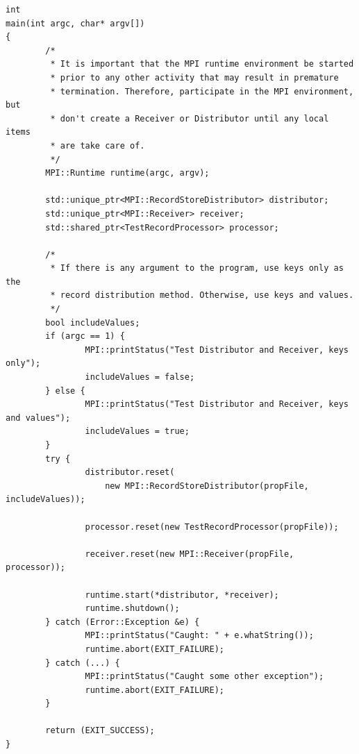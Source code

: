 \begin{lstlisting}[caption={MPI Framework Application Main}, label=lst:mpiappmain]
int
main(int argc, char* argv[])
{
        /*
         * It is important that the MPI runtime environment be started
         * prior to any other activity that may result in premature
         * termination. Therefore, participate in the MPI environment, but
         * don't create a Receiver or Distributor until any local items
         * are take care of.
         */
        MPI::Runtime runtime(argc, argv);

        std::unique_ptr<MPI::RecordStoreDistributor> distributor;
        std::unique_ptr<MPI::Receiver> receiver;
        std::shared_ptr<TestRecordProcessor> processor;

        /*
         * If there is any argument to the program, use keys only as the
         * record distribution method. Otherwise, use keys and values.
         */
        bool includeValues;
        if (argc == 1) {
                MPI::printStatus("Test Distributor and Receiver, keys only");
                includeValues = false;
        } else {
                MPI::printStatus("Test Distributor and Receiver, keys and values");
                includeValues = true;
        }
        try {
                distributor.reset(
                    new MPI::RecordStoreDistributor(propFile, includeValues));

                processor.reset(new TestRecordProcessor(propFile));

                receiver.reset(new MPI::Receiver(propFile, processor));

                runtime.start(*distributor, *receiver);
                runtime.shutdown();
        } catch (Error::Exception &e) {
                MPI::printStatus("Caught: " + e.whatString());
                runtime.abort(EXIT_FAILURE);
        } catch (...) {
                MPI::printStatus("Caught some other exception");
                runtime.abort(EXIT_FAILURE);
        }

        return (EXIT_SUCCESS);
}

\end{lstlisting}
